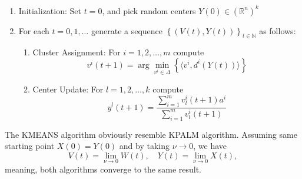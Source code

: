 \documentclass[11pt]{article}
\numberwithin{equation}{section}
\begin{document}
\begin{enumerate}[(1)]
	\item Initialization: Set $t=0$, and pick random centers $Y(0) \in (\mathbb{R}^n)^k$

	\item For each $t=0,1, \ldots$ generate a sequence $\left\lbrace(V(t),Y(t))\right\rbrace_{t \in \mathbb{N}}$ as follows:
	\begin{enumerate}[(2.1)]
		\item Cluster Assignment: For $i=1, 2, \ldots ,m$ compute
		\begin{equation}
			v^i(t+1) = \arg\min\limits_{v^i \in \Delta} \left\lbrace \langle v^i , d^i(Y(t)) \rangle\right\rbrace \label{StateEq12}
		\end{equation}
		
		\item Center Update: For $l=1, 2, \ldots ,k$ compute
		\begin{equation}
			y^l(t+1) = \frac{\sum_{i=1}^{m} v^i_l(t+1) a^i}{\sum_{i=1}^{m} v^i_l(t+1)} \label{StateEq13}
		\end{equation}
	\end{enumerate}
\end{enumerate}
The KMEANS algorithm obviously resemble KPALM algorithm. Assuming same starting point $X(0) = Y(0)$ and by taking $\nu \to 0$, we have
\begin{equation*}
	V(t) = \lim_{\nu \to 0} W(t), \quad
	Y(t) = \lim_{\nu \to 0} X(t),
\end{equation*}
meaning, both algorithms converge to the same result.

\newpage
\end{document}
